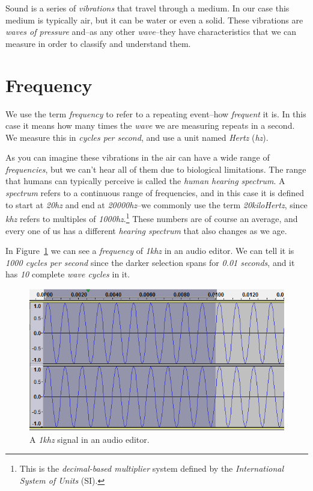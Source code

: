 \documentclass[10pt,a4paper]{report}
\newcommand{\ac}[1]{\textit{\mbox{\acrshort{#1}}}}
\newcommand{\hz}[1]{\textit{\mbox{#1\acrshort{hz}}}}
\newcommand{\khz}[1]{\textit{\mbox{#1\acrshort{khz}}}}
\begin{document}
Sound is a series of \textit{vibrations} that travel through a medium. In our case this medium is typically air, but it can be water or even a solid. These vibrations are \textit{waves of pressure} and--as any other \textit{wave}--they have characteristics that we can measure in order to classify and understand them. 

\section{Frequency}

We use the term \textit{frequency} to refer to a repeating event--how \textit{frequent} it is. In this case it means how many times the \textit{wave} we are measuring repeats in a second. We measure this in \textit{cycles per second}, and use a unit named \textit{Hertz} (\ac{hz}). 

As you can imagine these vibrations in the air can have a wide range of \textit{frequencies}, but we can't hear all of them due to biological limitations. The range that humans can typically perceive is called the \textit{human hearing spectrum}. A \textit{spectrum} refers to a continuous range of frequencies, and in this case it is defined to start at \hz{20} and end at \hz{20000}--we commonly use the term \textit{20kiloHertz}, since \ac{khz} refers to multiples of \hz{1000}.\footnote{This is the \textit{decimal-based multiplier} system defined by the \textit{International System of Units} (SI).} These numbers are of course an average, and every one of us has a different \textit{hearing spectrum} that also changes as we age.

In Figure~\ref{fig:frequency} we can see a \textit{frequency} of \khz{1} in an audio editor. We can tell it is \textit{1000 cycles per second} since the darker selection spans for \textit{0.01 seconds}, and it has \textit{10} complete \textit{wave cycles} in it.

\begin{figure}[H]
	\centering
	\includegraphics[width=0.8\linewidth]{images/audio/frequency.png}
	\caption[Frequency]{A \khz{1} signal in an audio editor.}
	\label{fig:frequency}
\end{figure}
\end{document}
